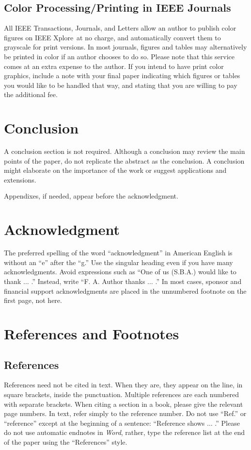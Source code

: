 \documentclass{ieeeaccess}
\begin{document}
\subsection{Color Processing/Printing in IEEE Journals}
All IEEE Transactions, Journals, and Letters allow an author to publish 
color figures on IEEE Xplore\textregistered\ at no charge, and automatically 
convert them to grayscale for print versions. In most journals, figures and 
tables may alternatively be printed in color if an author chooses to do so. 
Please note that this service comes at an extra expense to the author. If 
you intend to have print color graphics, include a note with your final 
paper indicating which figures or tables you would like to be handled that 
way, and stating that you are willing to pay the additional fee.

\section{Conclusion}
A conclusion section is not required. Although a conclusion may review the 
main points of the paper, do not replicate the abstract as the conclusion. A 
conclusion might elaborate on the importance of the work or suggest 
applications and extensions. 

\appendices

Appendixes, if needed, appear before the acknowledgment.

\section*{Acknowledgment}

The preferred spelling of the word ``acknowledgment'' in American English is 
without an ``e'' after the ``g.'' Use the singular heading even if you have 
many acknowledgments. Avoid expressions such as ``One of us (S.B.A.) would 
like to thank $\ldots$ .'' Instead, write ``F. A. Author thanks $\ldots$ .'' In most 
cases, sponsor and financial support acknowledgments are placed in the 
unnumbered footnote on the first page, not here.

\section*{References and Footnotes}

\subsection{References}
References need not be cited in text. When they are, they appear on the 
line, in square brackets, inside the punctuation. Multiple references are 
each numbered with separate brackets. When citing a section in a book, 
please give the relevant page numbers. In text, refer simply to the 
reference number. Do not use ``Ref.'' or ``reference'' except at the 
beginning of a sentence: ``Reference \cite{b3} shows $\ldots$ .'' Please do not use 
automatic endnotes in \emph{Word}, rather, type the reference list at the end of the 
paper using the ``References'' style.
\end{document}
